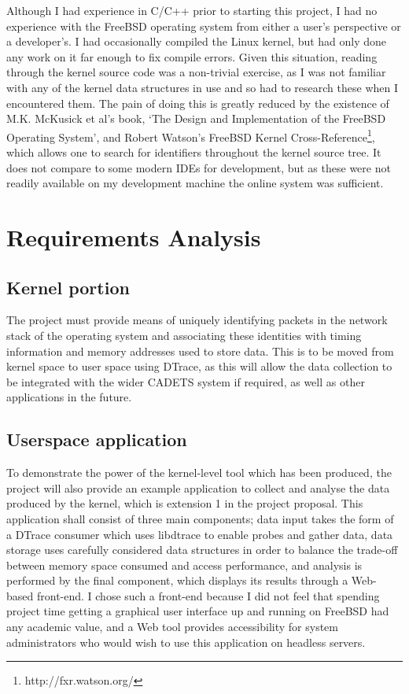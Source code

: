 \documentclass[a4paper,12pt,twoside,openright]{report}
\begin{document}
	Although I had experience in C/C++ prior to starting this project, I had no experience with the FreeBSD operating system from either a user's perspective or a developer's. I had occasionally compiled the Linux kernel, but had only done any work on it far enough to fix compile errors. Given this situation, reading through the kernel source code was a non-trivial exercise, as I was not familiar with any of the kernel data structures in use and so had to research these when I encountered them. The pain of doing this is greatly reduced by the existence of M.K. McKusick et al's book, `The Design and Implementation of the FreeBSD Operating System'\cite{McKusick:2014:DIF:2659919}, and Robert Watson's FreeBSD Kernel Cross-Reference\footnote{http://fxr.watson.org/}, which allows one to search for identifiers throughout the kernel source tree. It does not compare to some modern IDEs for development, but as these were not readily available on my development machine the online system was sufficient.
	
	\section{Requirements Analysis}
	
	\subsection{Kernel portion}
	
	The project must provide means of uniquely identifying packets in the network stack of the operating system and associating these identities with timing information and memory addresses used to store data. This is to be moved from kernel space to user space using DTrace, as this will allow the data collection to be integrated with the wider CADETS system if required, as well as other applications in the future.
	
	\subsection{Userspace application}
	
	To demonstrate the power of the kernel-level tool which has been produced, the project will also provide an example application to collect and analyse the data produced by the kernel, which is extension 1 in the project proposal. This application shall consist of three main components; data input takes the form of a DTrace consumer which uses libdtrace to enable probes and gather data, data storage uses carefully considered data structures in order to balance the trade-off between memory space consumed and access performance, and analysis is performed by the final component, which displays its results through a Web-based front-end. I chose such a front-end because I did not feel that spending project time getting a graphical user interface up and running on FreeBSD had any academic value, and a Web tool provides accessibility for system administrators who would wish to use this application on headless servers.
	
\end{document}
